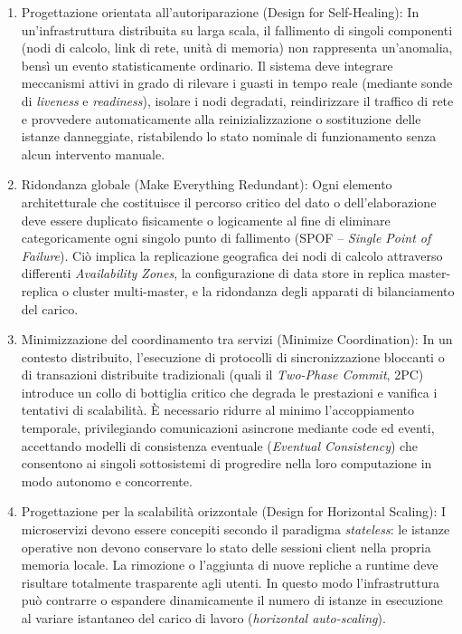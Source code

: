 \documentclass[11pt, a4paper]{article}
\begin{document}
\begin{enumerate}
    \item Progettazione orientata all'autoriparazione (Design for Self-Healing):
    In un'infrastruttura distribuita su larga scala, il fallimento di singoli componenti (nodi di calcolo, link di rete, unità di memoria) non rappresenta un'anomalia, bensì un evento statisticamente ordinario. Il sistema deve integrare meccanismi attivi in grado di rilevare i guasti in tempo reale (mediante sonde di \emph{liveness} e \emph{readiness}), isolare i nodi degradati, reindirizzare il traffico di rete e provvedere automaticamente alla reinizializzazione o sostituzione delle istanze danneggiate, ristabilendo lo stato nominale di funzionamento senza alcun intervento manuale.

    \item Ridondanza globale (Make Everything Redundant):
    Ogni elemento architetturale che costituisce il percorso critico del dato o dell'elaborazione deve essere duplicato fisicamente o logicamente al fine di eliminare categoricamente ogni singolo punto di fallimento (SPOF -- \emph{Single Point of Failure}). Ciò implica la replicazione geografica dei nodi di calcolo attraverso differenti \emph{Availability Zones}, la configurazione di data store in replica master-replica o cluster multi-master, e la ridondanza degli apparati di bilanciamento del carico.

    \item Minimizzazione del coordinamento tra servizi (Minimize Coordination):
    In un contesto distribuito, l'esecuzione di protocolli di sincronizzazione bloccanti o di transazioni distribuite tradizionali (quali il \emph{Two-Phase Commit}, 2PC) introduce un collo di bottiglia critico che degrada le prestazioni e vanifica i tentativi di scalabilità. È necessario ridurre al minimo l'accoppiamento temporale, privilegiando comunicazioni asincrone mediante code ed eventi, accettando modelli di consistenza eventuale (\emph{Eventual Consistency}) che consentono ai singoli sottosistemi di progredire nella loro computazione in modo autonomo e concorrente.

    \item Progettazione per la scalabilità orizzontale (Design for Horizontal Scaling):
    I microservizi devono essere concepiti secondo il paradigma \emph{stateless}: le istanze operative non devono conservare lo stato delle sessioni client nella propria memoria locale. La rimozione o l'aggiunta di nuove repliche a runtime deve risultare totalmente trasparente agli utenti. In questo modo l'infrastruttura può contrarre o espandere dinamicamente il numero di istanze in esecuzione al variare istantaneo del carico di lavoro (\emph{horizontal auto-scaling}).
\end{enumerate}
\end{document}
